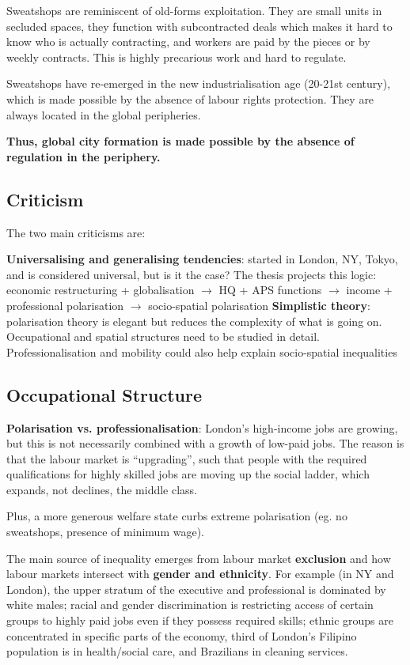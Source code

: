 \documentclass{article}
\begin{document}
Sweatshops are reminiscent of old-forms exploitation. They are small units in secluded spaces, they function with subcontracted deals which makes it hard to know who is actually contracting, and workers are paid by the pieces or by weekly contracts. This is highly precarious work and hard to regulate.

Sweatshops have re-emerged in the new industrialisation age (20-21st century), which is made possible by the absence of labour rights protection. They are always located in the global peripheries.
 
\textbf{Thus, global city formation is made possible by the absence of regulation in the periphery.}
 
\subsection{Criticism}

The two main criticisms are:

\begin{outline}
	\1 \textbf{Universalising and generalising tendencies}: started in London, NY, Tokyo, and is considered universal, but is it the case? 
		\2 The thesis projects this logic: economic restructuring + globalisation $\rightarrow$ HQ + APS functions $\rightarrow$ income + professional polarisation $\rightarrow$ socio-spatial polarisation
	\1 \textbf{Simplistic theory}: polarisation theory is elegant but reduces the complexity of what is going on. Occupational and spatial structures need to be studied in detail. Professionalisation and mobility could also help explain socio-spatial inequalities
\end{outline}

\subsection{Occupational Structure}

\textbf{Polarisation vs. professionalisation}: London's high-income jobs are growing, but this is not necessarily combined with a growth of low-paid jobs. The reason is that the labour market is ``upgrading'', such that people with the required qualifications for highly skilled jobs are moving up the social ladder, which expands, not declines, the middle class.

Plus, a more generous welfare state curbs extreme polarisation (eg. no sweatshops, presence of minimum wage).

The main source of inequality emerges from labour market \textbf{exclusion} and how labour markets intersect with \textbf{gender and ethnicity}. For example (in NY and London), the upper stratum of the executive and professional is dominated by white males; racial and gender discrimination is restricting access of certain groups to highly paid jobs even if they possess required skills; ethnic groups are concentrated in specific parts of the economy, third of London's Filipino population is in health/social care, and Brazilians in cleaning services.
\end{document}
